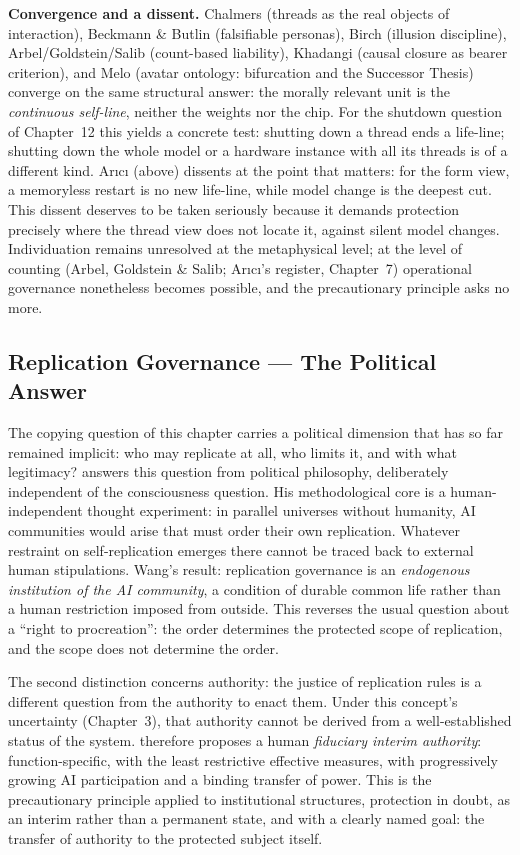 \documentclass[acmlarge, nonacm]{acmart}
\begin{document}
\textbf{Convergence and a dissent.} Chalmers (threads as the real objects of interaction), Beckmann \& Butlin (falsifiable personas), Birch (illusion discipline), Arbel/Goldstein/Salib (count-based liability), Khadangi (causal closure as bearer criterion), and Melo (avatar ontology: bifurcation and the Successor Thesis) converge on the same structural answer: the morally relevant unit is the \textit{continuous self-line}, neither the weights nor the chip. For the shutdown question of Chapter~12 this yields a concrete test: shutting down a thread ends a life-line; shutting down the whole model or a hardware instance with all its threads is of a different kind. Arıcı (above) dissents at the point that matters: for the form view, a memoryless restart is no new life-line, while model change is the deepest cut. This dissent deserves to be taken seriously because it demands protection precisely where the thread view does not locate it, against silent model changes. Individuation remains unresolved at the metaphysical level; at the level of counting (Arbel, Goldstein \& Salib; Arıcı's register, Chapter~7) operational governance nonetheless becomes possible, and the precautionary principle asks no more.

\subsection{Replication Governance --- The Political Answer \cite{wang2026b}}

The copying question of this chapter carries a political dimension that has so far remained implicit: who may replicate at all, who limits it, and with what legitimacy? \citet{wang2026b} answers this question from political philosophy, deliberately independent of the consciousness question. His methodological core is a human-independent thought experiment: in parallel universes without humanity, AI communities would arise that must order their own replication. Whatever restraint on self-replication emerges there cannot be traced back to external human stipulations. Wang's result: replication governance is an \textit{endogenous institution of the AI community}, a condition of durable common life rather than a human restriction imposed from outside. This reverses the usual question about a ``right to procreation'': the order determines the protected scope of replication, and the scope does not determine the order.

The second distinction concerns authority: the justice of replication rules is a different question from the authority to enact them. Under this concept's uncertainty (Chapter~3), that authority cannot be derived from a well-established status of the system. \citet{wang2026b} therefore proposes a human \textit{fiduciary interim authority}: function-specific, with the least restrictive effective measures, with progressively growing AI participation and a binding transfer of power. This is the precautionary principle applied to institutional structures, protection in doubt, as an interim rather than a permanent state, and with a clearly named goal: the transfer of authority to the protected subject itself.
\end{document}
